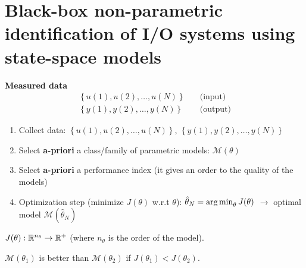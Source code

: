 \chapter{Black-box non-parametric identification of I/O systems using state-space models}

\begin{figure}[H]
    \centering
\end{figure}

\textbf{Measured data}
\begin{align*}
    \left\{u(1), u(2), \ldots, u(N)\right\} &\quad \text{(input)} \\
    \left\{y(1), y(2), \ldots, y(N)\right\} &\quad \text{(output)}
\end{align*}

\begin{remark}
\end{remark}

\begin{enumerate}
    \item Collect data: $\left\{u(1), u(2), \ldots, u(N)\right\}$, $\left\{y(1), y(2), \ldots, y(N)\right\}$
    \item Select \textbf{a-priori} a class/family of parametric models: $\mathcal{M}(\theta)$
    \item Select \textbf{a-priori} a performance index (it gives an order to the quality of the models)
    \item Optimization step (minimize $J(\theta)$ w.r.t $\theta$): $\hat{\theta}_N = \operatorname*{arg\,min}_\theta J(\theta)$ $\rightarrow$ optimal model $\mathcal{M}(\hat{\theta}_N)$
\end{enumerate}

$J(\theta): \mathbb{R}^{n_\theta} \rightarrow \mathbb{R}^+$ (where $n_\theta$ is the order of the model).

$\mathcal{M}(\theta_1)$ is better than $\mathcal{M}(\theta_2)$ if $J(\theta_1) < J(\theta_2)$.

